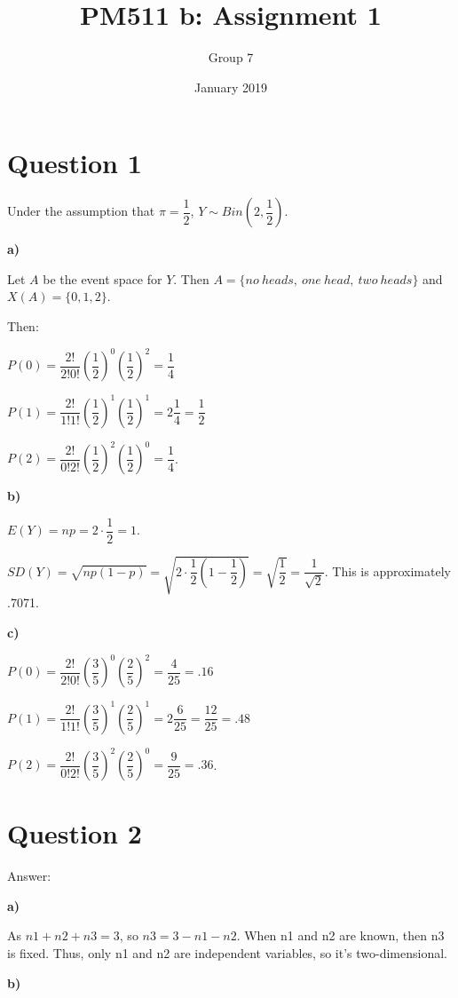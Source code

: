 \documentclass{article}
\title{PM511 b: Assignment 1}
\author{Group 7}
\date{January 2019}
\begin{document}
\selectfont

\maketitle

\section*{Question 1}

Under the assumption that $\pi=\dfrac{1}{2}$, $Y \sim Bin(2, \dfrac{1}{2})$.

\textbf{a)}

Let $A$ be the event space for $Y$. Then $A=\{no \  heads, \ one \ head, \ two \ heads \}$ and $X(A)=\{0, 1, 2 \}$.

Then:


$P(0)=\dfrac{2!}{2! 0!}(\dfrac{1}{2})^0(\dfrac{1}{2})^2=\dfrac{1}{4}$

$P(1)=\dfrac{2!}{1! 1!}(\dfrac{1}{2})^1(\dfrac{1}{2})^1=2\dfrac{1}{4}=\dfrac{1}{2}$

$P(2)=\dfrac{2!}{0! 2!}(\dfrac{1}{2})^2(\dfrac{1}{2})^0=\dfrac{1}{4}$.


\textbf{b)}

$E(Y)=np=2 \cdot \dfrac{1}{2}= 1$.

$SD(Y)=\sqrt{np(1-p)}=\sqrt{2\cdot \dfrac{1}{2}(1-\dfrac{1}{2})}=\sqrt{\dfrac{1}{2}}=\dfrac{1}{\sqrt{2}}$. This is approximately .7071.

\textbf{c)}

$P(0)=\dfrac{2!}{2! 0!}(\dfrac{3}{5})^0(\dfrac{2}{5})^2=\dfrac{4}{25}=.16$

$P(1)=\dfrac{2!}{1! 1!}(\dfrac{3}{5})^1(\dfrac{2}{5})^1=2\dfrac{6}{25}=\dfrac{12}{25}=.48$

$P(2)=\dfrac{2!}{0! 2!}(\dfrac{3}{5})^2(\dfrac{2}{5})^0=\dfrac{9}{25}=.36$.


\section*{Question 2}

Answer:

\textbf{a)}

As $n1+n2+n3=3$, so $n3=3-n1-n2$.
When n1 and n2 are known, then n3 is fixed.
Thus, only n1 and n2 are independent variables, so it's two-dimensional.

\textbf{b)}
\end{document}
